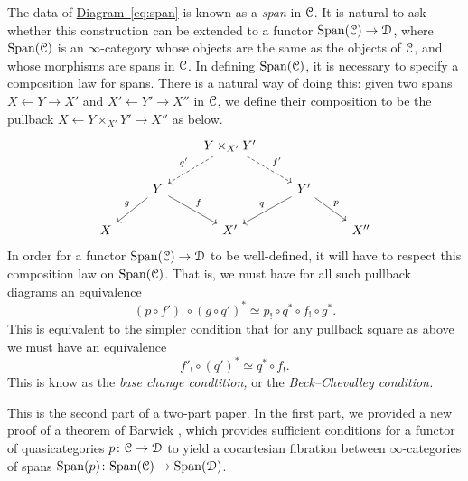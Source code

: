 \documentclass[main.tex]{subfiles}
\begin{document}
The data of \hyperref[eq:span]{Diagram~\ref*{eq:span}} is known as a \emph{span} in $\mathcal{C}$. It is natural to ask whether this construction can be extended to a functor $\mathrm{Span}(\mathcal{C}) \to \mathcal{D}$, where $\mathrm{Span}(\mathcal{C})$ is an $\infty$-category whose objects are the same as the objects of $\mathcal{C}$, and whose morphisms are spans in $\mathcal{C}$. In defining $\mathrm{Span}(\mathcal{C})$, it is necessary to specify a composition law for spans. There is a natural way of doing this: given two spans $X \leftarrow Y \rightarrow X'$ and $X' \leftarrow Y' \rightarrow X''$ in $\mathcal{C}$, we define their composition to be the pullback $X \leftarrow Y \times_{X'} Y' \rightarrow X''$ as below.
\begin{equation*}
  \begin{tikzcd}
    && Y \times_{X'} Y'
    \arrow[dl, dashed, swap, "q'"]
    \arrow[dr, dashed, "f'"]
    \\
    & Y
    \arrow[dl, swap, "g"]
    \arrow[dr, "f"]
    && Y'
    \arrow[dl, swap, "q"]
    \arrow[dr, "p"]
    \\
    X
    && X'
    && X''
  \end{tikzcd}
\end{equation*}
In order for a functor $\mathrm{Span}(\mathcal{C}) \to \mathcal{D}$ to be well-defined, it will have to respect this composition law on $\mathrm{Span}(\mathcal{C})$. That is, we must have for all such pullback diagrams an equivalence
\begin{equation*}
  (p \circ f')_{!} \circ (g \circ q')^{*} \simeq p_{!} \circ q^{*} \circ f_{!} \circ g^{*}.
\end{equation*}
This is equivalent to the simpler condition that for any pullback square as above we must have an equivalence
\begin{equation*}
  f'_{!} \circ (q')^{*} \simeq q^{*} \circ f_{!}.
\end{equation*}
This is know as the \emph{base change condtition,} or the \emph{Beck--Chevalley condition.}

This is the second part of a two-part paper. In the first part, we provided a new proof of a theorem of Barwick \cite[Thm.~12.2]{spectralmackeyfunctors1}, which provides sufficient conditions for a functor of quasicategories $p\colon \mathcal{C} \to \mathcal{D}$ to yield a cocartesian fibration between $\infty$-categories of spans $\mathrm{Span}(p)\colon \mathrm{Span}(\mathcal{C}) \to \mathrm{Span}(\mathcal{D})$. %
\end{document}
